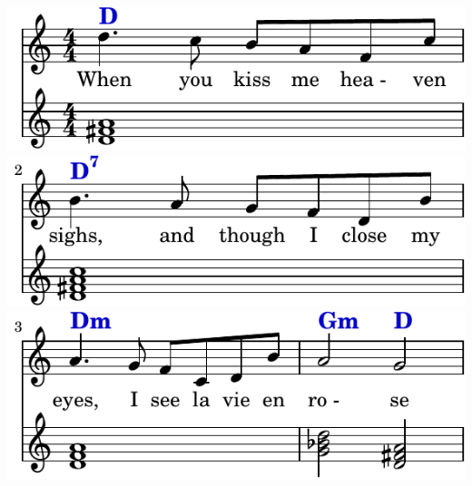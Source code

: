 \includegraphics{81/lily-b9bd3583-1}%
\ifx\betweenLilyPondSystem \undefined
  \linebreak
\else
  \expandafter{}%
\fi
\includegraphics{81/lily-b9bd3583-2}%
\ifx\betweenLilyPondSystem \undefined
  \linebreak
\else
  \expandafter{}%
\fi
\includegraphics{81/lily-b9bd3583-3}%
